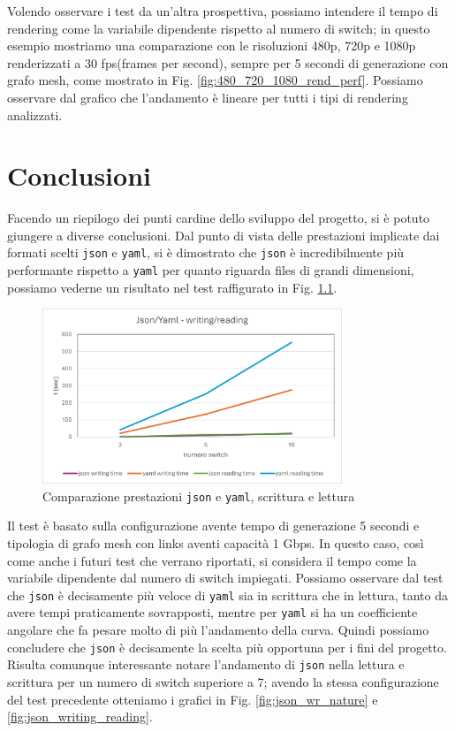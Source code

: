 \documentclass[binding=0.6cm]{sapthesis}
\begin{document}
Volendo osservare i test da un'altra prospettiva, possiamo intendere il tempo di rendering come la variabile dipendente rispetto al numero di switch; in questo
esempio mostriamo una comparazione con le risoluzioni 480p, 720p e 1080p renderizzati a 30 fps(frames per second),
 sempre per 5 secondi di generazione con grafo mesh, come mostrato in Fig. \ref{fig:480_720_1080_rend_perf}. Possiamo osservare dal grafico che l'andamento è lineare per tutti i tipi di rendering analizzati.

\chapter{Conclusioni}
Facendo un riepilogo dei punti cardine dello sviluppo del progetto, si è potuto giungere a diverse conclusioni. Dal punto di vista delle prestazioni implicate
dai formati scelti \texttt{json} e \texttt{yaml}, si è dimostrato che \texttt{json} è incredibilmente più performante rispetto a \texttt{yaml} per quanto riguarda files di grandi dimensioni, possiamo vederne un risultato nel test raffigurato in Fig. \ref{fig:json_yaml_wr_comparison}.

\begin{figure}[h]
    \centering
    \includegraphics[width=0.8\textwidth]{immagini/json_yaml_wr_comparison.png}
    \caption{Comparazione prestazioni \texttt{json} e \texttt{yaml}, scrittura e lettura}
    \label{fig:json_yaml_wr_comparison}
\end{figure}

Il test è basato sulla configurazione avente tempo di generazione 5 secondi e tipologia di grafo mesh con links aventi capacità 1 Gbps.
In questo caso, così come anche i futuri test che verrano riportati, si considera il tempo come la variabile dipendente dal numero di switch impiegati.
Possiamo osservare dal test che \texttt{json} è decisamente più veloce di \texttt{yaml} sia in scrittura che in lettura, tanto da avere tempi praticamente sovrapposti, mentre per \texttt{yaml} si ha un coefficiente angolare che fa pesare molto di più l'andamento della curva. Quindi possiamo concludere che \texttt{json} è decisamente la scelta più opportuna 
per i fini del progetto. Risulta comunque interessante notare l'andamento di \texttt{json} nella lettura e scrittura per un numero di switch superiore a 7; avendo la stessa configurazione del test precedente otteniamo i grafici in Fig. \ref{fig:json_wr_nature} e \ref{fig:json_writing_reading}.
\end{document}

